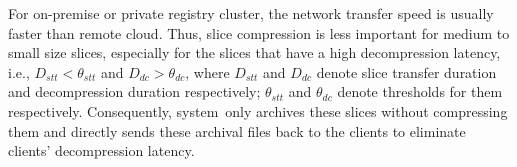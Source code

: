 For on-premise or private registry cluster, the network transfer speed is usually faster than remote cloud.
Thus, slice compression is less important for medium to small size slices, 
especially for the slices that have a high decompression latency, 
i.e., $D_{stt} < \theta_{stt}$ and $D_{dc} > \theta_{dc}$, where $D_{stt}$ and $D_{dc}$ denote slice transfer duration
and decompression duration respectively; 
$\theta_{stt}$ and $\theta_{dc}$ denote thresholds for them respectively.
Consequently, \dedupname system~only archives these slices without compressing them and directly sends
these archival files back to the clients to eliminate clients' decompression latency.




